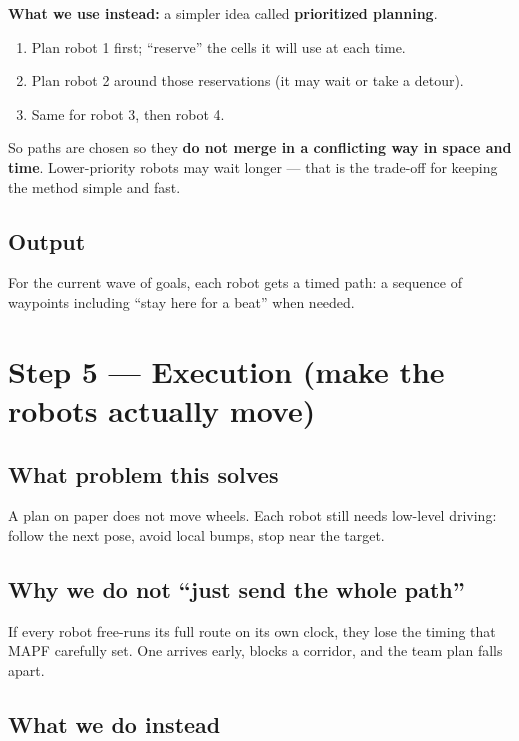 \documentclass[11pt,a4paper]{article}
\begin{document}
\textbf{What we use instead:} a simpler idea called \textbf{prioritized
planning}.
\begin{enumerate}[leftmargin=*]
  \item Plan robot 1 first; ``reserve'' the cells it will use at each time.
  \item Plan robot 2 around those reservations (it may wait or take a detour).
  \item Same for robot 3, then robot 4.
\end{enumerate}

So paths are chosen so they \textbf{do not merge in a conflicting way in space
and time}. Lower-priority robots may wait longer --- that is the trade-off for
keeping the method simple and fast.

\subsection{Output}

For the current wave of goals, each robot gets a timed path: a sequence of
waypoints including ``stay here for a beat'' when needed.

\section{Step 5 --- Execution (make the robots actually move)}

\subsection{What problem this solves}

A plan on paper does not move wheels. Each robot still needs low-level
driving: follow the next pose, avoid local bumps, stop near the target.

\subsection{Why we do not ``just send the whole path''}

If every robot free-runs its full route on its own clock, they lose the
timing that MAPF carefully set. One arrives early, blocks a corridor, and the
team plan falls apart.

\subsection{What we do instead}
\end{document}
